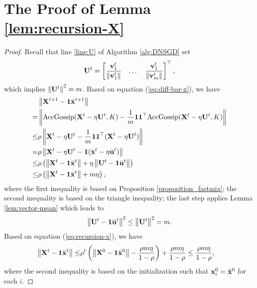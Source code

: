 \documentclass[sigconf]{acmart}
\newcommand{\Norm}[1]{\left\| #1 \right\|}
\def\vone{{\bf{1}}}
\def\vu{{\bf{u}}}
\def\vv{{\bf{v}}}
\def\vx{{\bf{x}}}
\def\mU {{\bf U}}
\def\mX {{\bf X}}
\theoremstyle{plain}
\def\bx{{\bar\vx}}
\def\bu{{\bar\vu}}
\def\AG{{\rm AccGossip}}
\begin{document}
\section{The Proof of Lemma \ref{lem:recursion-X}}
\begin{proof}    
Recall that line \ref{line:U} of Algorithm \ref{alg:DNSGD} set
\begin{align*}
\mU^t = \begin{bmatrix}
        \dfrac{\vv^t_1}{\Norm{\vv^t_1}} & \dots & \dfrac{\vv^t_1}{\Norm{\vv^t_m}}
\end{bmatrix}^\top,    
\end{align*}
which implies $\Norm{\mU^t}^2=m$.
Based on equation (\ref{eq:diff-bar-x}), we have
\begin{align}\label{eq:recursion-x}
\begin{split}    
  &  \Norm{\mX^{t+1}-\vone\bx^{t+1}} \\
= &  \Norm{\AG(\mX^t - \eta \mU^t, K) - \frac{1}{m}\vone\vone^\top\AG(\mX^t - \eta \mU^t, K)} \\
\leq & \rho\Norm{\mX^t - \eta \mU^t- \frac{1}{m}\vone\vone^\top(\mX^t - \eta \mU^t)} \\
= & \rho\Norm{\mX^t - \eta \mU^t- \vone(\bx^t - \eta \bu^t)} \\
\leq & \rho\left(\Norm{\mX^t - \vone\bx^t} + \eta\Norm{\mU^t - \vone\bu^t}\right) \\
\leq & \rho\left(\Norm{\mX^t - \vone\bx^t} + m\eta\right),
\end{split}
\end{align}
where the first inequality is based on Proposition \ref{proposition_fastmix}; 
the second inequality is based on the triangle inequality;
the last step applies Lemma \ref{lem:vector-mean} which leads to
\begin{align*}
    \Norm{\mU^t - \vone\bu^t}^2 
\leq \Norm{\mU^t}^2 = m.
\end{align*}
Based on equation (\ref{eq:recursion-x}), we have
\begin{align*}
    \Norm{\mX^t-\vone\bx^t} 
\leq & \rho^t\left(\Norm{\mX^0 - \vone\bx^0} - \frac{\rho m\eta}{1-\rho}\right) + \frac{\rho m\eta}{1-\rho} \leq \frac{\rho m\eta}{1-\rho}, 
\end{align*}
where the second inequality is based on the initialization such that $\vx_i^0=\bar\vx^0$ for each $i$.

\end{proof}
\end{document}
